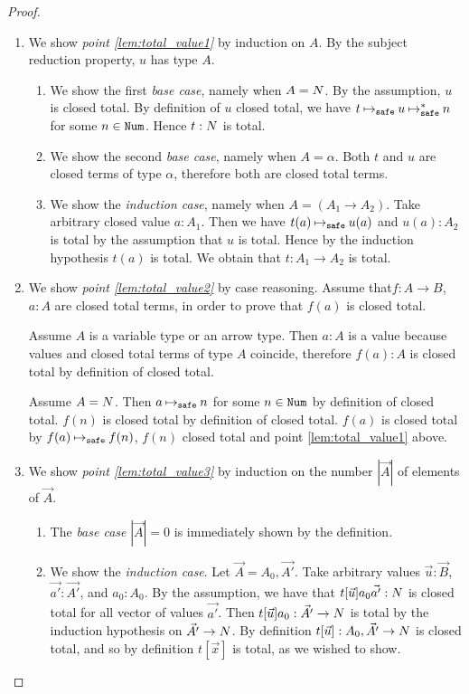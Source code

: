 \begin{proof}
\begin{enumerate}

\item
  We show \emph{point \ref{lem:total_value1}}  by induction on $A$. 
By the subject reduction property, $u$ has type $A$.
\begin{enumerate}
\item
  We show the first \emph{base case}, namely when $A ={N}$.
  By the assumption, $u$ is closed total.
  By definition of $u$ closed total, 
  we have $t \mathbin{\mathbin{\mapsto}_{\hbox{\scriptsize \tt safe}}} u \mathbin{\mathbin{\mapsto}_{\hbox{\scriptsize \tt safe}}^*} n$ for some $n\in{\tt Num}$. 
  Hence $t:{N}$ is total.
\item
  We show the second \emph{base case}, namely when $A =\alpha$.
  Both $t$ and $u$ are closed terms of type $\alpha$, therefore both are closed total terms.
\item
  We show the \emph{induction case}, namely when $A = (A_1\rightarrow A_2)$.
  Take arbitrary closed value $a:A_1$. Then we have $t(a) \mathbin{\mathbin{\mapsto}_{\hbox{\scriptsize \tt safe}}} u(a)$ and 
  $u(a):A_2$ is total by the assumption that $u$ is total.
  Hence by the induction hypothesis $t(a)$ is total. 
  We obtain that $t:A_1\rightarrow A_2$ is total. 
\end{enumerate}

  \item
We show \emph{point \ref{lem:total_value2}} by case reasoning.
Assume that$f:A \rightarrow B$, $a:A$ are closed total terms, in order to prove
that $f(a)$  is closed total.

Assume $A$ is a variable type or an arrow type. 
Then $a:A$ is a value because values and closed total terms of type $A$
coincide, therefore $f(a):A$ is closed total by definition of closed total.

Assume $A={N}$. Then $a \mathbin{\mathbin{\mapsto}_{\hbox{\scriptsize \tt safe}}} n$ for some $n \in {\tt Num}$ by definition of closed total.
$f(n)$ is closed total by definition of closed total. $f(a)$ is closed total by $f(a) \mathbin{\mathbin{\mapsto}_{\hbox{\scriptsize \tt safe}}} f(n)$,
$f(n)$ closed total and point \ref{lem:total_value1} above.

\item  
We show \emph{point \ref{lem:total_value3}} by induction on the number $|\vec{A}|$ of
elements of $\vec{A}$.
\begin{enumerate}
\item
  The \emph{base case} $|\vec{A}| = 0$ is immediately shown by the definition.
\item
  We show the \emph{induction case}. Let $\vec{A} = A_0,\vec{A'}$.
  Take arbitrary values $\vec{u}:\vec{B}$, $\vec{a'}:\vec{A'}$, and $a_0:A_0$. 
  By the assumption, we have that $t[\vec{u}]a_0\vec{a'}:{N}$ is closed total for all 
  vector of values $\vec{a'}$. 
  Then $t[\vec{u}]a_0:\vec{A'}\rightarrow{N}$ is total 
  by the induction hypothesis on $\vec{A'}\rightarrow {N}$.
  By definition $t[\vec{u}] : A_0,\vec{A'}\rightarrow{N}$ is closed total,
  and so by definition $t[\vec{x}]$ is total, as we wished to show.
\end{enumerate}

\end{enumerate}
\end{proof}

